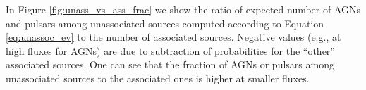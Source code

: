 In Figure \ref{fig:unass_vs_ass_frac} we show the ratio of expected number of AGNs and pulsars among unassociated sources computed according to Equation \ref{eq:unassoc_ev} to the number of associated sources.
Negative values (e.g., at high fluxes for AGNs) are due to subtraction of probabilities for the ``other'' associated sources.
One can see that the fraction of AGNs or pulsars among unassociated sources to the associated ones is higher at smaller fluxes.






